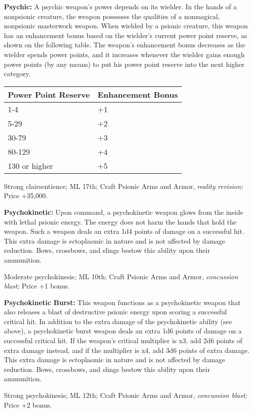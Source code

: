 \documentclass{article}
\begin{document}
\textbf{Psychic:} A psychic weapon's power depends on its wielder. In the hands 
of a nonpsionic creature, the weapon possesses the qualities of a nonmagical, nonpsionic 
masterwork weapon. When wielded by a psionic creature, this weapon has an enhancement 
bonus based on the wielder's current power point reserve, as shown on the following 
table. The weapon's enhancement bonus decreases as the wielder spends power points, 
and it increases whenever the wielder gains enough power points (by any means) 
to put his power point reserve into the next higher category.

\begin{tabular}{|>{\raggedright}p{87pt}|>{\raggedright}p{86pt}|}
\hline
P\textbf{ower Point Reserve} & E\textbf{nhancement Bonus}\tabularnewline
\hline
1-4  & +1\tabularnewline
\hline
5-29  & +2\tabularnewline
\hline
30-79  & +3\tabularnewline
\hline
80-129  & +4\tabularnewline
\hline
130 or higher  & +5\tabularnewline
\hline
\end{tabular}

Strong clairsentience; ML 17th; Craft Psionic Arms and Armor, \textit{reality revision; 
}Price +35,000.

\textbf{Psychokinetic:} Upon command, a psychokinetic weapon glows from the inside 
with lethal psionic energy. The energy does not harm the hands that hold the weapon. 
Such a weapon deals an extra 1d4 points of damage on a successful hit. This extra 
damage is ectoplasmic in nature and is not affected by damage reduction. Bows, 
crossbows, and slings bestow this ability upon their ammunition.

Moderate psychokinesis\textit{; }ML 10th; Craft Psionic Arms and Armor, \textit{concussion 
blast; }Price +1 bonus.

\textbf{Psychokinetic Burst:} This weapon functions as a psychokinetic weapon that 
also releases a blast of destructive psionic energy upon scoring a successful critical 
hit. In addition to the extra damage of the psychokinetic ability (see above), 
a psychokinetic burst weapon deals an extra 1d6 points of damage on a successful 
critical hit. If the weapon's critical multiplier is x3, add 2d6 points of extra 
damage instead, and if the multiplier is x4, add 3d6 points of extra damage. This 
extra damage is ectoplasmic in nature and is not affected by damage reduction. 
Bows, crossbows, and slings bestow this ability upon their ammunition.

Strong psychokinesis; ML 12th; Craft Psionic Arms and Armor, \textit{concussion 
blast; }Price +2 bonus.
\end{document}
